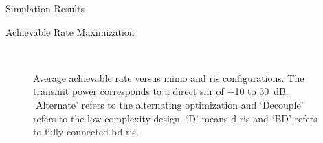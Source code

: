 \documentclass[journal]{IEEEtran}
\begin{document}
\begin{section}{Simulation Results}
\begin{subsection}{Achievable Rate Maximization}
		\begin{figure}[!t]
			\centering
			\\
			\caption{
				Average achievable rate versus \gls{mimo} and \gls{ris} configurations.
				The transmit power corresponds to a direct \gls{snr} of \num{-10} to \qty{30}{dB}.
				`Alternate' refers to the alternating optimization and `Decouple' refers to the low-complexity design.
				`D' means \gls{d}-\gls{ris} and `BD' refers to fully-connected \gls{bd}-\gls{ris}.
			}
			\label{fg:rate}
		\end{figure}


\end{subsection}
\end{section}
\end{document}
